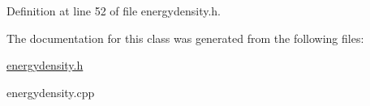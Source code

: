 Definition at line 52 of file energydensity.\+h.



The documentation for this class was generated from the following files\+:\begin{DoxyCompactItemize}
\item 
\hyperlink{energydensity_8h}{energydensity.\+h}\item 
energydensity.\+cpp\end{DoxyCompactItemize}
